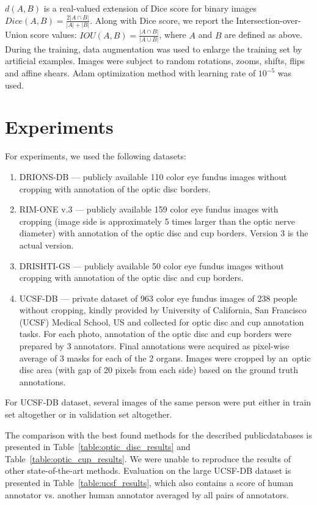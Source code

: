 \documentclass{llncs}
\begin{document}
$d(A, B)$ is a real-valued extension of Dice score for binary images $Dice(A, B) = \frac{2|A \cap B|}{|A| + |B|}$. Along with Dice score, we report the Intersection-over-Union score values: $IOU(A, B) = \frac{|A \cap B|}{|A \cup B|}$, where $A$ and $B$ are defined as above. During the training, data augmentation was used to enlarge the training set by artificial examples. Images were subject to random rotations, zooms, shifts, flips and affine shears. Adam optimization method with learning rate of $10^{-5}$ was used.

\section{Experiments}

For experiments, we used the following datasets:
\begin{enumerate}
\item DRIONS-DB \cite{drionsdb} --- publicly available 110 color eye fundus images without cropping with annotation of the optic disc borders.
\item RIM-ONE v.3 \cite{rimone} --- publicly available 159 color eye fundus images with cropping (image side is approximately 5 times larger than the optic nerve diameter) with annotation of the optic disc and cup borders. Version 3 is the actual version.
\item DRISHTI-GS \cite{drishtigs1,drishtigs2} --- publicly available 50 color eye fundus images without cropping with annotation of the optic disc and cup borders. 
\item UCSF-DB --- private dataset of 963 color eye fundus images of 238 people without cropping, kindly provided by University of California, San Francisco (UCSF) Medical School, US and collected for optic disc and cup annotation tasks. For each photo, annotation of the optic disc and cup borders were prepared by 3 annotators. Final annotations were acquired as pixel-wise average of 3 masks for each of the 2 organs. Images were cropped by an~optic disc area (with gap of 20 pixels from each side) based on the ground truth annotations.
\end{enumerate}

For UCSF-DB dataset, several images of the same person were put either in train set altogether or in validation set altogether.

The comparison with the best found methods for the described public\linebreak databases is presented in Table~\ref{table:optic_disc_results} and Table~\ref{table:optic_cup_results}. We were unable to reproduce the results of other state-of-the-art methods. Evaluation on the large UCSF-DB dataset is presented in Table~\ref{table:ucsf_results}, which also contains a score of human annotator vs. another human annotator averaged by all pairs of annotators.
\end{document}

